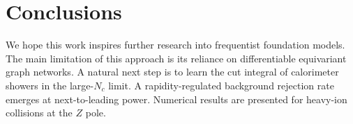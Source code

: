 \section{Conclusions}\label{sec:conclusions}

We hope this work inspires further research into frequentist foundation
models. The main limitation of this approach is its reliance on
differentiable equivariant graph networks. A natural next step is to
learn the cut integral of calorimeter showers in the large-$N_c$ limit.
A rapidity-regulated background rejection rate emerges at
next-to-leading power. Numerical results are presented for heavy-ion
collisions at the $Z$ pole.

